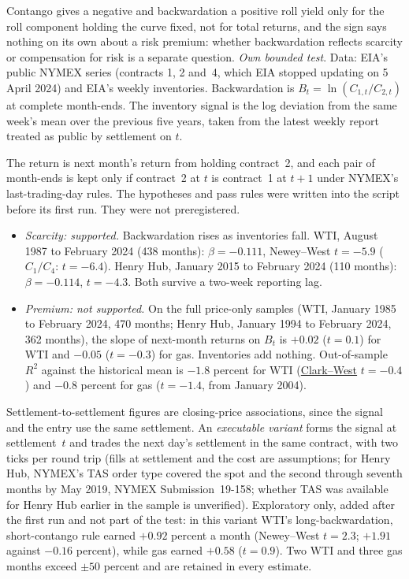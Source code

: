 \begin{qfdefinition}
 Contango gives a negative and backwardation a positive roll yield only for the roll component holding the curve fixed, not for total returns, and the sign says nothing on its own about a risk premium: whether backwardation reflects scarcity or compensation for risk is a separate question. \emph{Own bounded test}. Data: EIA's public NYMEX series (contracts 1, 2 and~4, which EIA stopped updating on 5 April 2024) and EIA's weekly inventories. Backwardation is $B_t=\ln(C_{1,t}/C_{2,t})$ at complete month-ends. The inventory signal is the log deviation from the same week's mean over the previous five years, taken from the latest weekly report treated as public by settlement on $t$.

The return is next month's return from holding contract~2, and each pair of month-ends is kept only if contract~2 at $t$ is contract~1 at $t+1$ under NYMEX's last-trading-day rules. The hypotheses and pass rules were written into the script before its first run. They were not preregistered.
\begin{itemize}
\item \emph{Scarcity: supported.} Backwardation rises as inventories fall. WTI, August 1987 to February 2024 (438 months): $\beta=-0.111$, Newey--West $t=-5.9$ ($C_1/C_4$: $t=-6.4$). Henry Hub, January 2015 to February 2024 (110 months): $\beta=-0.114$, $t=-4.3$. Both survive a two-week reporting lag.
\item \emph{Premium: not supported.} On the full price-only samples (WTI, January 1985 to February 2024, 470 months; Henry Hub, January 1994 to February 2024, 362 months), the slope of next-month returns on $B_t$ is $+0.02$ ($t=0.1$) for WTI and $-0.05$ ($t=-0.3$) for gas. Inventories add nothing. Out-of-sample $R^2$ against the historical mean is $-1.8$ percent for WTI (\hyperref[meth:nested-forecast-tests]{Clark--West} $t=-0.4$) and $-0.8$ percent for gas ($t=-1.4$, from January 2004).
\end{itemize}
Settlement-to-settlement figures are closing-price associations, since the signal and the entry use the same settlement. An \emph{executable variant} forms the signal at settlement~$t$ and trades the next day's settlement in the same contract, with two ticks per round trip (fills at settlement and the cost are assumptions; for Henry Hub, NYMEX's TAS order type covered the spot and the second through seventh months by May 2019, NYMEX Submission~19-158; whether TAS was available for Henry Hub earlier in the sample is unverified). Exploratory only, added after the first run and not part of the test: in this variant WTI's long-backwardation, short-contango rule earned $+0.92$ percent a month (Newey--West $t=2.3$; $+1.91$ against $-0.16$ percent), while gas earned $+0.58$ ($t=0.9$). Two WTI and three gas months exceed $\pm50$ percent and are retained in every estimate.


\end{qfdefinition}
